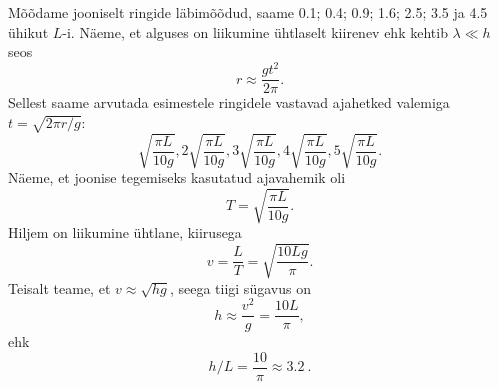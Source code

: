 \solu
Mõõdame jooniselt ringide läbimõõdud, saame \num{0,1}; \num{0,4}; \num{0,9}; \num{1,6}; \num{2,5}; \num{3,5} ja \num{4,5} ühikut $L$-i. Näeme, et alguses on liikumine ühtlaselt kiirenev ehk kehtib $\lambda \ll h$ seos
\[
r \approx \frac{gt^2}{2 \pi}.
\]
Sellest saame arvutada esimestele ringidele vastavad ajahetked valemiga $t = \sqrt{2 \pi r/g}$: 
\[
\sqrt{\frac{\pi L}{10 g}}, 2 \sqrt{\frac{\pi L}{10 g}}, 3 \sqrt{\frac{\pi L}{10 g}}, 4 \sqrt{\frac{\pi L}{10 g}}, 5 \sqrt{\frac{\pi L}{10 g}}.
\]
Näeme, et joonise tegemiseks kasutatud ajavahemik oli
\[
T=\sqrt{\frac{\pi L}{10 g}}.
\]
Hiljem on liikumine ühtlane, kiirusega
\[
v=\frac{L}{T}=\sqrt{\frac{10 L g}{\pi}}.
\]
Teisalt teame, et $v \approx \sqrt{hg}$, seega tiigi sügavus on
\[
h \approx \frac{v^2}{g} = \frac{10 L}{\pi},
\]
ehk 
\[
h/L = \frac{10}{\pi} \approx \SI{3,2}{}.
\]

